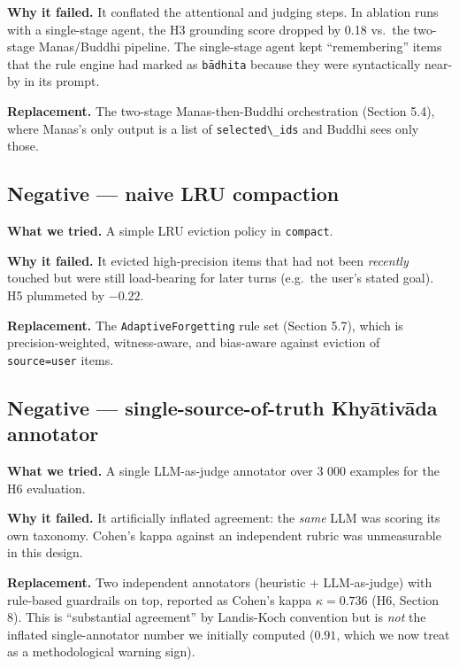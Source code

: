 \textbf{Why it failed.} It conflated the attentional and judging steps. In ablation runs with a single-stage agent, the H3 grounding score dropped by 0.18 vs.~the two-stage Manas/Buddhi pipeline. The single-stage agent kept ``remembering'' items that the rule engine had marked as \passthrough{\lstinline!bādhita!} because they were syntactically near-by in its prompt.

\textbf{Replacement.} The two-stage Manas-then-Buddhi orchestration (Section 5.4), where Manas's only output is a list of \passthrough{\lstinline!selected\_ids!} and Buddhi sees only those.

\subsection{Negative --- naive LRU compaction}\label{negative-naive-lru-compaction}

\textbf{What we tried.} A simple LRU eviction policy in \passthrough{\lstinline!compact!}.

\textbf{Why it failed.} It evicted high-precision items that had not been \emph{recently} touched but were still load-bearing for later turns (e.g.~the user's stated goal). H5 plummeted by \(-0.22\).

\textbf{Replacement.} The \passthrough{\lstinline!AdaptiveForgetting!} rule set (Section 5.7), which is precision-weighted, witness-aware, and bias-aware against eviction of \passthrough{\lstinline!source=user!} items.

\subsection{Negative --- single-source-of-truth Khyātivāda annotator}\label{negative-single-source-of-truth-khyux101tivux101da-annotator}

\textbf{What we tried.} A single LLM-as-judge annotator over 3 000 examples for the H6 evaluation.

\textbf{Why it failed.} It artificially inflated agreement: the \emph{same} LLM was scoring its own taxonomy. Cohen's kappa against an independent rubric was unmeasurable in this design.

\textbf{Replacement.} Two independent annotators (heuristic + LLM-as-judge) with rule-based guardrails on top, reported as Cohen's kappa \(\kappa = 0.736\) (H6, Section 8). This is ``substantial agreement'' by Landis-Koch convention but is \emph{not} the inflated single-annotator number we initially computed (\(0.91\), which we now treat as a methodological warning sign).

